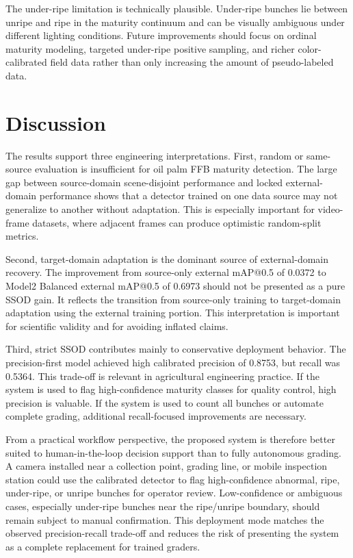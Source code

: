 ﻿\documentclass[12pt]{article}
\begin{document}
The under-ripe limitation is technically plausible. Under-ripe bunches lie between unripe and ripe in the maturity continuum and can be visually ambiguous under different lighting conditions. Future improvements should focus on ordinal maturity modeling, targeted under-ripe positive sampling, and richer color-calibrated field data rather than only increasing the amount of pseudo-labeled data.

\section{Discussion}

The results support three engineering interpretations. First, random or same-source evaluation is insufficient for oil palm FFB maturity detection. The large gap between source-domain scene-disjoint performance and locked external-domain performance shows that a detector trained on one data source may not generalize to another without adaptation. This is especially important for video-frame datasets, where adjacent frames can produce optimistic random-split metrics.

Second, target-domain adaptation is the dominant source of external-domain recovery. The improvement from source-only external mAP@0.5 of 0.0372 to Model2 Balanced external mAP@0.5 of 0.6973 should not be presented as a pure SSOD gain. It reflects the transition from source-only training to target-domain adaptation using the external training portion. This interpretation is important for scientific validity and for avoiding inflated claims.

Third, strict SSOD contributes mainly to conservative deployment behavior. The precision-first model achieved high calibrated precision of 0.8753, but recall was 0.5364. This trade-off is relevant in agricultural engineering practice. If the system is used to flag high-confidence maturity classes for quality control, high precision is valuable. If the system is used to count all bunches or automate complete grading, additional recall-focused improvements are necessary.

From a practical workflow perspective, the proposed system is therefore better suited to human-in-the-loop decision support than to fully autonomous grading. A camera installed near a collection point, grading line, or mobile inspection station could use the calibrated detector to flag high-confidence abnormal, ripe, under-ripe, or unripe bunches for operator review. Low-confidence or ambiguous cases, especially under-ripe bunches near the ripe/unripe boundary, should remain subject to manual confirmation. This deployment mode matches the observed precision-recall trade-off and reduces the risk of presenting the system as a complete replacement for trained graders.
\end{document}
